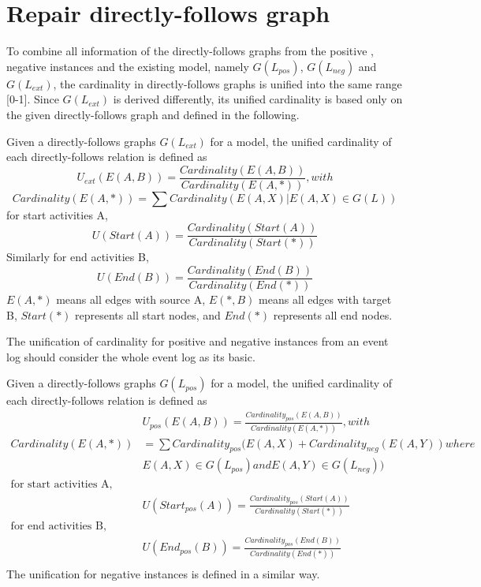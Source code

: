 \section{Repair directly-follows graph}
To combine all information of the directly-follows graphs from the positive , negative instances and the existing model, namely $G(L_{pos})$, $G(L_{neg})$ and $G(L_{ext})$, the cardinality in directly-follows graphs is unified into the same range [0-1]. Since $G(L_{ext})$ is derived differently, its unified cardinality is based only on the given directly-follows graph and defined in the following. 
\begin{definition}
Given a directly-follows graphs $G(L_{ext})$ for a model, the unified cardinality of each directly-follows relation is defined as \[ U_{ext}(E(A,B)) = \frac{Cardinality(E(A,B))}{Cardinality(E(A,*))}, with \]
	\[ Cardinality(E(A,*))=\sum{Cardinality(E(A,X) \vert E(A,X) \in G(L))}  \] 
	for start activities A, 
	\[ U(Start(A)) = \frac{Cardinality(Start(A))}{Cardinality(Start(*))} \]
	Similarly for end activities B,
	\[ U(End(B)) = \frac{Cardinality(End(B))}{Cardinality(End(*))} \]
$E(A,*)$ means all edges with source A, $E(*,B)$ means all edges with target B, $Start(*)$ represents all start nodes, and $End(*)$ represents all end nodes. 
\end{definition}
The unification of cardinality for positive and negative instances from an event log should consider the whole event log as its basic. 
\begin{definition}
	Given a directly-follows graphs $G(L_{pos})$ for a model, the unified cardinality of each directly-follows relation is defined as 
	\begin{align*}
		&U_{pos}(E(A,B)) = \frac{Cardinality_{pos}(E(A,B))}{Cardinality(E(A,*))}, with  \\ 
		Cardinality(E(A,*))&=\sum{Cardinality_{pos}(E(A,X) + Cardinality_{neg}(E(A,Y))} where \\
		&	E(A,X) \in G(L_{pos}) and E(A,Y) \in G(L_{neg})) \\
		\text{for start activities A, } \\
		&U(Start_{pos}(A)) = \frac{Cardinality_{pos}(Start(A))}{Cardinality(Start(*))} \\
		\text{for end activities B,} \\
		&U(End_{pos}(B)) = \frac{Cardinality_{pos}(End(B))}{Cardinality(End(*))} \\
	\end{align*}
The unification for negative instances is defined in a similar way.  
\end{definition}

